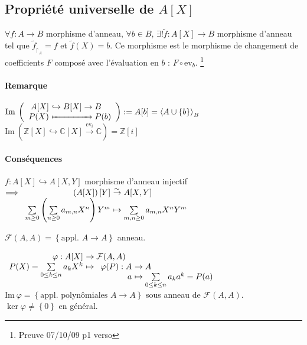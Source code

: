 \documentclass[reqno,a4paper,10pt]{report}
\makeatletter
\newcommand{\mt}[1]{\widetilde{#1}} %
\newcommand{\gen}[1]{\left\langle #1 \right\rangle} %
\newcommand{\set}[1]{\left\lbrace #1 \right\rbrace} %
\newcommand{\im}{\mathrm{Im}\:} %
\newcommand{\IZ}{\ensuremath{\mathbb{Z}}\xspace} %
\newcommand{\IC}{\ensuremath{\mathbb{C}}\xspace} %
\newcommand{\soo}{\Longrightarrow}
\newcommand{\inj}{\hookrightarrow}
\newcommand{\bij}{\overset{\!\sim}{\to}} %
\newcommand{\rstrct}[2]{{#1}_{\upharpoonright_{#2}}} %
\newcommand{\pfootnote}[1]{\up{(}\footnote{#1}\up{)}} %
\newcommand{\ev}[1]{\mathrm{ev}_{ #1 }}
\let\oldenumerate=\enumerate%
\renewenvironment{enumerate}{%
    \oldenumerate%
  }{%
    \@noparlisttrue%
    \endlist%
  }%
\makeatother
\begin{document}
\subsection{Propriété universelle de $A[X]$}
$\forall f : A \to B$ morphisme d'anneau, $\forall b \in B$, $\exists !
\mt{f} : A[X] \to B$ morphisme d'anneau tel que $\rstrct{\mt{f}}{A} = f$ et
$\mt{f}(X)=b$. Ce morphisme est le morphisme de changement de coefficients $F$
composé avec l'évaluation en $b$ : $F\circ \ev{b}$.
  \pfootnote{Preuve 07/10/09 p1 verso}

\paragraph{Remarque} $\im \left( \begin{array}{r@{\ }l}
  A[X] &\inj B[X] \to B \\
  P(X) &\xmapsto{\hphantom{\!\textstyle \!\inj B[X] \to\!\!}}  P(b)
\end{array}\right):=A[b]=\gen{A\cup\set{b}}_B$\\
$\im\left( \IZ[X] \inj \IC[X] \xrightarrow{\ev i} \IC\right)=\IZ[i]$

\paragraph{Conséquences}
\begin{enumerate}
  \item $f:A[X] \inj A[X,Y]$ morphisme d'anneau injectif\\
    $\soo \begin{array}[t]{r@{\ }l}
      \left( A[X] \right)[Y] &\bij A[X,Y]\\
      \sum\limits_{m\geq 0} \left( \sum\limits_{n\geq 0} a_{m,n} X^n \right)
      Y^m &\mapsto \sum\limits_{m,n \geq 0} a_{m,n} X^n Y^m
    \end{array}$
  \item $\mathcal{F}(A,A)=\set{\text{appl. } A \to A}$ anneau.

    $\begin{array}[t]{r@{\ }l}
      \varphi : A[X] &\to \mathcal{F}(A,A)\\
      P(X)=\sum\limits_{0\leq k \leq n} a_k X^k &\mapsto
      \begin{array}[t]{r@{\ }l}
        \varphi(P) : A &\to A\\
        a &\mapsto \sum\limits_{0\leq k \leq n} a_k a^k = P(a)
      \end{array}
    \end{array}$\\
    $\im \varphi = \set{\text{appl. polynômiales } A \to A}$ sous anneau de
    $\mathcal F(A,A)$.\\
    $\ker \varphi \neq \set{0}$ en général.
\end{enumerate}
\end{document}
